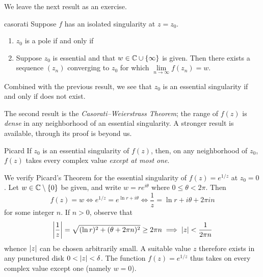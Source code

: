 \goodbreak

We leave the next result as an exercise.

\begin{thm}{}{casorati}
	Suppose $f$ has an isolated singularity at $z=z_0$.
	\begin{enumerate}
	  \item $z_0$ is a pole if and only if 
	  \item Suppose $z_0$ is essential and that $w\in\mathbb{C}\cup\{\infty\}$ is given. Then there exists a sequence $(z_n)$ converging to $z_0$ for which $\lim\limits_{n\to\infty} f(z_n)=w$. 
	\end{enumerate}
\end{thm}

Combined with the previous result, we see that $z_0$ is an essential singularity if and only if  does not exist.\smallbreak

The second result is the \emph{Casorati--Weierstrass Theorem}; the range of $f(z)$ is \emph{dense} in any neighborhood of an essential singularity. A stronger result is available, through its proof is beyond us.

\begin{thm}{Picard}{}
	If $z_0$ is an essential singularity of $f(z)$, then, on any neighborhood of $z_0$, $f(z)$ takes every complex value \emph{except at most one}.
\end{thm}

\begin{example}{}{}
	We verify Picard's Theorem for the essential singularity of $f(z)=e^{1/z}$ at $z_0=0$. Let $w\in\mathbb{C}\setminus\{0\}$ be given, and write $w=re^{i\theta}$ where $0\le \theta<2\pi$. Then
	\[
		f(z)=w\iff e^{1/z}=e^{\ln r+i\theta} \iff \frac 1z=\ln r+i\theta+2\pi in
	\]
	for some integer $n$. If $n>0$, observe that
	\[
		\left| \frac 1z\right|=\sqrt{(\ln r)^2+(\theta+2\pi n)^2}\ge 2\pi n \implies \left| z\right|<\frac 1{2\pi n}
	\]
	whence $\left| z\right|$ can be chosen arbitrarily small. A suitable value $z$ therefore exists in any punctured disk $0<\left| z\right|<\delta$. The function $f(z)=e^{1/z}$ thus takes on every complex value except one (namely $w=0$).
\end{example}



